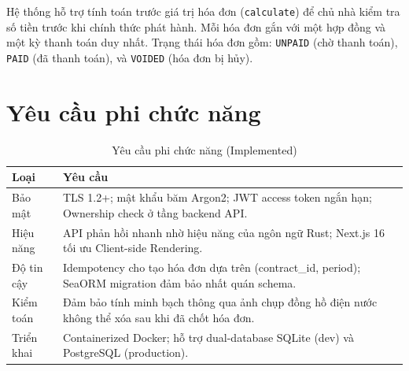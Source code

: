 Hệ thống hỗ trợ tính toán trước giá trị hóa đơn (\texttt{calculate}) để chủ nhà kiểm tra số tiền trước khi chính thức phát hành. Mỗi hóa đơn gắn với một hợp đồng và một kỳ thanh toán duy nhất. Trạng thái hóa đơn gồm: \texttt{UNPAID} (chờ thanh toán), \texttt{PAID} (đã thanh toán), và \texttt{VOIDED} (hóa đơn bị hủy).

\section{Yêu cầu phi chức năng}

\begin{table}[htbp]
\centering
\caption{Yêu cầu phi chức năng (Implemented)}
\label{tab:nfr}
\begin{tabularx}{\textwidth}{lX}
\toprule
\textbf{Loại} & \textbf{Yêu cầu} \\
\midrule
Bảo mật & TLS 1.2+; mật khẩu băm Argon2; JWT access token ngắn hạn; Ownership check ở tầng backend API. \\[5pt]
Hiệu năng & API phản hồi nhanh nhờ hiệu năng của ngôn ngữ Rust; Next.js 16 tối ưu Client-side Rendering. \\[5pt]
Độ tin cậy & Idempotency cho tạo hóa đơn dựa trên (contract\_id, period); SeaORM migration đảm bảo nhất quán schema. \\[5pt]
Kiểm toán & Đảm bảo tính minh bạch thông qua ảnh chụp đồng hồ điện nước không thể xóa sau khi đã chốt hóa đơn. \\[5pt]
Triển khai & Containerized Docker; hỗ trợ dual-database SQLite (dev) và PostgreSQL (production). \\
\bottomrule
\end{tabularx}
\end{table}
